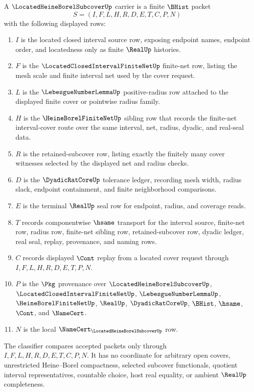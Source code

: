 \begin{definition}
\label{def:located-heine-borel-subcover-carrier}
A $\LocatedHeineBorelSubcoverUp$ carrier is a finite $\BHist$ packet
$$
S=(I,F,L,H,R,D,E,T,C,P,N)
$$
with the following displayed rows:
\begin{enumerate}
\item $I$ is the located closed interval source row, exposing endpoint names, endpoint order, and locatedness only as finite $\RealUp$ histories.
\item $F$ is the $\LocatedClosedIntervalFiniteNetUp$ finite-net row, listing the mesh scale and finite interval net used by the cover request.
\item $L$ is the $\LebesgueNumberLemmaUp$ positive-radius row attached to the displayed finite cover or pointwise radius family.
\item $H$ is the $\HeineBorelFiniteNetUp$ sibling row that records the finite-net interval-cover route over the same interval, net, radius, dyadic, and real-seal data.
\item $R$ is the retained-subcover row, listing exactly the finitely many cover witnesses selected by the displayed net and radius checks.
\item $D$ is the $\DyadicRatCoreUp$ tolerance ledger, recording mesh width, radius slack, endpoint containment, and finite neighborhood comparisons.
\item $E$ is the terminal $\RealUp$ seal row for endpoint, radius, and coverage reads.
\item $T$ records componentwise $\hsame$ transport for the interval source, finite-net row, radius row, finite-net sibling row, retained-subcover row, dyadic ledger, real seal, replay, provenance, and naming rows.
\item $C$ records displayed $\Cont$ replay from a located cover request through $I,F,L,H,R,D,E,T,P,N$.
\item $P$ is the $\Pkg$ provenance over $\LocatedHeineBorelSubcoverUp$, $\LocatedClosedIntervalFiniteNetUp$, $\LebesgueNumberLemmaUp$, $\HeineBorelFiniteNetUp$, $\RealUp$, $\DyadicRatCoreUp$, $\BHist$, $\hsame$, $\Cont$, and $\NameCert$.
\item $N$ is the local $\NameCert_{\LocatedHeineBorelSubcoverUp}$ row.
\end{enumerate}
The classifier compares accepted packets only through $I,F,L,H,R,D,E,T,C,P,N$. It has no coordinate for arbitrary open covers, unrestricted Heine--Borel compactness, selected subcover functionals, quotient interval representatives, countable choice, host real equality, or ambient $\RealUp$ completeness.
\end{definition}

